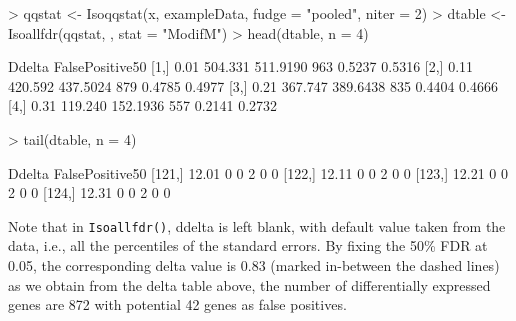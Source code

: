 \documentclass[10pt]{mybook4}
\begin{document}
\begin{Schunk}
\begin{Sinput}
> qqstat <- Isoqqstat(x, exampleData, fudge = "pooled", niter = 2)
> dtable <- Isoallfdr(qqstat, , stat = "ModifM")
> head(dtable, n = 4)
\end{Sinput}
\begin{Soutput}
     Ddelta FalsePositive50%
[1,]   0.01          504.331         511.9190    963 0.5237 0.5316
[2,]   0.11          420.592         437.5024    879 0.4785 0.4977
[3,]   0.21          367.747         389.6438    835 0.4404 0.4666
[4,]   0.31          119.240         152.1936    557 0.2141 0.2732
\end{Soutput}
\begin{Sinput}
> tail(dtable, n = 4)
\end{Sinput}
\begin{Soutput}
       Ddelta FalsePositive50%
[121,]  12.01                0                0      2      0      0
[122,]  12.11                0                0      2      0      0
[123,]  12.21                0                0      2      0      0
[124,]  12.31                0                0      2      0      0
\end{Soutput}
\end{Schunk}

  
Note that in \texttt{Isoallfdr()}, ddelta is left blank, with default value taken
from the data, i.e., all the percentiles of the standard errors.
By fixing the 50\% FDR at 0.05, the corresponding delta value is 0.83
(marked in-between the dashed lines) as we obtain from the delta table above,
the number of differentially expressed genes are 872 with potential 42 genes as false positives.
\end{document}
